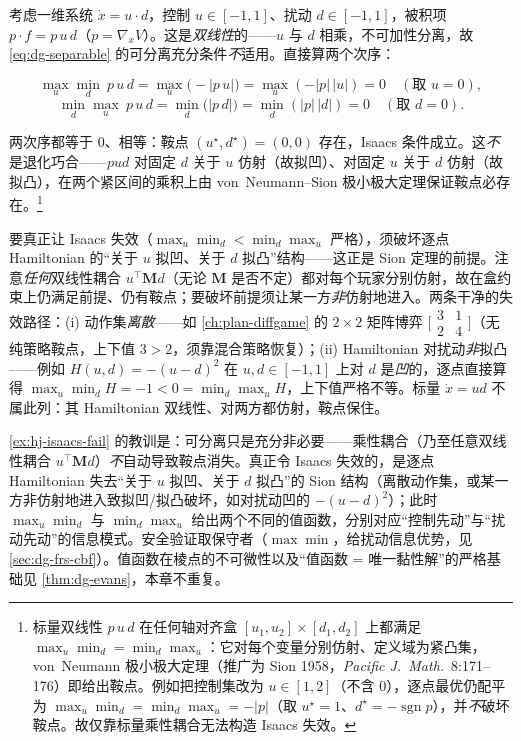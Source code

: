 \begin{example}[不可分离但仍有鞍点：标量双线性 $\dot x=u\,d$]
\label{ex:hj-isaacs-fail}
考虑一维系统 $\dot x=u\cdot d$，控制 $u\in[-1,1]$、扰动 $d\in[-1,1]$，被积项 $p\cdot f=p\,u\,d$（$p=\nabla_xV$）。这是\emph{双线性}的——$u$ 与 $d$ 相乘，不可加性分离，故\cref{eq:dg-separable} 的可分离充分条件\emph{不}适用。直接算两个次序：

\[
\max_{u}\min_{d}\ p\,u\,d=\max_{u}\big(-|p\,u|\big)=\max_u(-|p|\,|u|)=0\quad(\text{取 }u=0),
\]
\[
\min_{d}\max_{u}\ p\,u\,d=\min_{d}\big(|p\,d|\big)=\min_d(|p|\,|d|)=0\quad(\text{取 }d=0).
\]

两次序都等于 $0$、相等：鞍点 $(u^\star,d^\star)=(0,0)$ 存在，Isaacs 条件成立。这\emph{不}是退化巧合——$pud$ 对固定 $d$ 关于 $u$ 仿射（故拟凹）、对固定 $u$ 关于 $d$ 仿射（故拟凸），在两个紧区间的乘积上由 von~Neumann--Sion 极小极大定理保证鞍点必存在。\footnote{标量双线性 $p\,u\,d$ 在任何轴对齐盒 $[u_1,u_2]\times[d_1,d_2]$ 上都满足 $\max_u\min_d=\min_d\max_u$：它对每个变量分别仿射、定义域为紧凸集，von~Neumann 极小极大定理（推广为 Sion 1958，\emph{Pacific J.\ Math.}\ 8:171--176）即给出鞍点。例如把控制集改为 $u\in[1,2]$（不含 $0$），逐点最优仍配平为 $\max_u\min_d=\min_d\max_u=-|p|$（取 $u^\star=1$、$d^\star=-\operatorname{sgn}p$），并\emph{不}破坏鞍点。故仅靠标量乘性耦合无法构造 Isaacs 失效。}

要真正让 Isaacs 失效（$\max_u\min_d<\min_d\max_u$ 严格），须破坏逐点 Hamiltonian 的“关于 $u$ 拟凹、关于 $d$ 拟凸”结构——这正是 Sion 定理的前提。注意\emph{任何}双线性耦合 $u^\top\mathbf M d$（无论 $\mathbf M$ 是否不定）都对每个玩家分别仿射，故在盒约束上仍满足前提、仍有鞍点；要破坏前提须让某一方\emph{非}仿射地进入。两条干净的失效路径：(i) 动作集\emph{离散}——如 \cref{ch:plan-diffgame} 的 $2\times2$ 矩阵博弈 $\big[\begin{smallmatrix}3&1\\2&4\end{smallmatrix}\big]$（无纯策略鞍点，上下值 $3>2$，须靠混合策略恢复）；(ii) Hamiltonian 对扰动\emph{非}拟凸——例如 $H(u,d)=-(u-d)^2$ 在 $u,d\in[-1,1]$ 上对 $d$ 是\emph{凹}的，逐点直接算得 $\max_u\min_d H=-1<0=\min_d\max_u H$，上下值严格不等。标量 $\dot x=ud$ 不属此列：其 Hamiltonian 双线性、对两方都仿射，鞍点保住。
\end{example}

\begin{remark}
\cref{ex:hj-isaacs-fail} 的教训是：可分离只是充分非必要——乘性耦合（乃至任意双线性耦合 $u^\top\mathbf M d$）\emph{不}自动导致鞍点消失。真正令 Isaacs 失效的，是逐点 Hamiltonian 失去“关于 $u$ 拟凹、关于 $d$ 拟凸”的 Sion 结构（离散动作集，或某一方非仿射地进入致拟凹/拟凸破坏，如对扰动凹的 $-(u-d)^2$）；此时 $\max_u\min_d$ 与 $\min_d\max_u$ 给出两个不同的值函数，分别对应“控制先动”与“扰动先动”的信息模式。安全验证取保守者（$\max\min$，给扰动信息优势，见 \cref{sec:dg-frs-cbf}）。值函数在棱点的不可微性以及“值函数 = 唯一黏性解”的严格基础见 \cref{thm:dg-evans}，本章不重复。
\end{remark}


